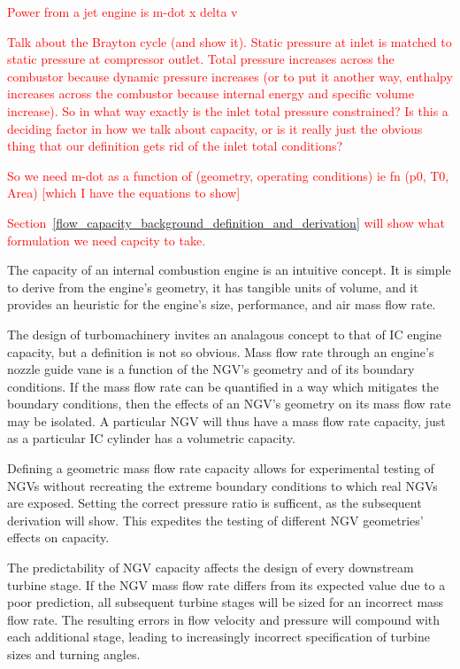 \documentclass[a4paper, 11pt, twoside]{report}
\begin{document}
\textcolor{red}{Power from a jet engine is m-dot x delta v}

\textcolor{red}{Talk about the Brayton cycle (and show it). Static pressure at inlet is matched to static pressure at compressor outlet. Total pressure increases across the combustor because dynamic pressure increases (or to put it another way, enthalpy increases across the combustor because internal energy and specific volume increase). So in what way exactly is the inlet total pressure constrained? Is this a deciding factor in how we talk about capacity, or is it really just the obvious thing that our definition gets rid of the inlet total conditions?}

\textcolor{red}{So we need m-dot as a function of (geometry, operating conditions) ie fn (p0, T0, Area) [which I have the equations to show]}

\textcolor{red}{Section~\ref{flow_capacity_background_definition_and_derivation} will show what formulation we need capcity to take.}

The capacity of an internal combustion engine is an intuitive concept. It is simple to derive from the engine's geometry, it has tangible units of volume, and it provides an heuristic for the engine's size, performance, and air mass flow rate.

The design of turbomachinery invites an analagous concept to that of IC engine capacity, but a definition is not so obvious. Mass flow rate through an engine's nozzle guide vane is a function of the NGV's geometry and of its boundary conditions. If the mass flow rate can be quantified in a way which mitigates the boundary conditions, then the effects of an NGV's geometry on its mass flow rate may be isolated. A particular NGV will thus have a mass flow rate capacity, just as a particular IC cylinder has a volumetric capacity.

Defining a geometric mass flow rate capacity allows for experimental testing of NGVs without recreating the extreme boundary conditions to which real NGVs are exposed. Setting the correct pressure ratio is sufficent, as the subsequent derivation will show. This expedites the testing of different NGV geometries' effects on capacity.

The predictability of NGV capacity affects the design of every downstream turbine stage. If the NGV mass flow rate differs from its expected value due to a poor prediction, all subsequent turbine stages will be sized for an incorrect mass flow rate. The resulting errors in flow velocity and pressure will compound with each additional stage, leading to increasingly incorrect specification of turbine sizes and turning angles.
\end{document}
